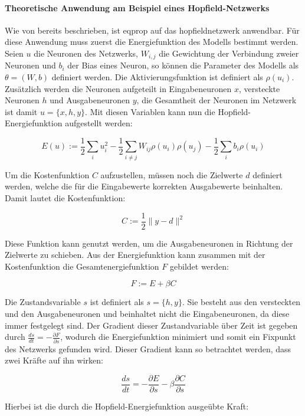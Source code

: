 \paragraph{Theoretische Anwendung am Beispiel eines Hopfield-Netzwerks}
\label{chap:Theoretische Anwendung am Beispiel eines Hopfield-Netzwerks}

Wie von \cite{Scellier2017} bereits beschrieben, ist \gls{eqprop} auf das \gls{hopfieldnetzwerk} anwendbar. Für diese Anwendung muss zuerst die Energiefunktion des Modells bestimmt werden. Seien \(u\) die Neuronen des Netzwerks, \(W_{i,j}\) die Gewichtung der Verbindung zweier Neuronen und \(b_i\) der Bias eines Neuron, so können die Parameter des Modells als \(\theta=(W,b)\) definiert werden. Die Aktivierungsfunktion ist definiert als \(\rho(u_i)\). Zusätzlich werden die Neuronen aufgeteilt in Eingabeneuronen \(x\), versteckte Neuronen \(h\) und Ausgabeneuronen \(y\), die Gesamtheit der Neuronen im Netzwerk ist damit \(u=\{x,h,y\}\). Mit diesen Variablen kann nun die Hopfield-Energiefunktion aufgestellt werden:

\[E(u):=\frac{1}{2}\sum_iu_i^2-\frac{1}{2}\sum_{i\neq{j}}W_{ij}\rho(u_i)\rho(u_j)-\frac{1}{2}\sum_ib_i\rho(u_i)\]

Um die Kostenfunktion \(C\) aufzustellen, müssen noch die Zielwerte \(d\) definiert werden, welche die für die Eingabewerte korrekten Ausgabewerte beinhalten. Damit lautet die Kostenfunktion:

\[C:=\frac{1}{2}\|y-d\|^2\]

Diese Funktion kann genutzt werden, um die Ausgabeneuronen in Richtung der Zielwerte zu schieben. Aus der Energiefunktion kann zusammen mit der Kostenfunktion die Gesamtenergiefunktion \(F\) gebildet werden:

\[F:=E+\beta C\]

Die Zustandsvariable \(s\) ist definiert als \(s=\{h,y\}\). Sie besteht aus den versteckten und den Ausgabeneuronen und beinhaltet nicht die Eingabeneuronen, da diese immer festgelegt sind. Der Gradient dieser Zustandvariable über Zeit ist gegeben durch \(\frac{ds}{dt}=-\frac{\partial F}{\partial s}\), wodurch die Energiefunktion minimiert und somit ein Fixpunkt des Netzwerks gefunden wird. Dieser Gradient kann so betrachtet werden, dass zwei Kräfte auf ihn wirken:

\[\frac{ds}{dt}=-\frac{\partial E}{\partial s}-\beta\frac{\partial C}{\partial s}\]

Hierbei ist die durch die Hopfield-Energiefunktion ausgeübte Kraft:

